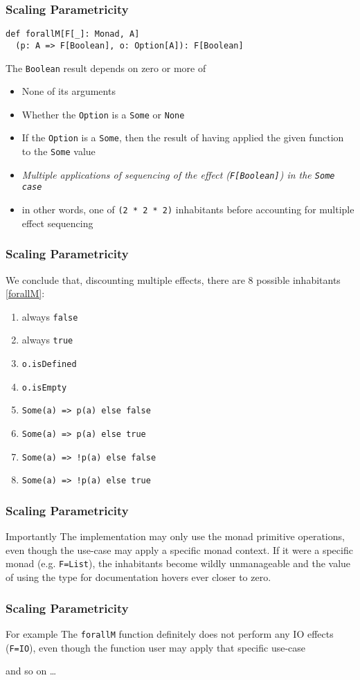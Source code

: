 \begin{frame}[fragile]
\frametitle{Scaling Parametricity}
\begin{lstlisting}[style=scala]
def forallM[F[_]: Monad, A]
  (p: A => F[Boolean], o: Option[A]): F[Boolean]
\end{lstlisting}
\begin{theorem}
  The \lstinline{Boolean} result depends on zero or more of
  \begin{itemize}
    \item None of its arguments
    \item Whether the \lstinline{Option} is a \lstinline{Some} or \lstinline{None}
    \item If the \lstinline{Option} is a \lstinline{Some}, then the result of having applied the given function to the \lstinline{Some} value
    \item \emph{Multiple applications of sequencing of the effect (\lstinline{F[Boolean]}) in the \lstinline{Some case}}
    \item in other words, one of \lstinline{(2 * 2 * 2)} inhabitants before accounting for multiple effect sequencing
  \end{itemize}
\end{theorem}
\end{frame}

\begin{frame}[fragile]
\frametitle{Scaling Parametricity}
  We conclude that, discounting multiple effects, there are 8 possible inhabitants \ref{forallM}:
  \begin{enumerate}
    \item always \lstinline{false}
    \item always \lstinline{true}
    \item \lstinline{o.isDefined}
    \item \lstinline{o.isEmpty}
    \item \lstinline{Some(a) => p(a) else false}
    \item \lstinline{Some(a) => p(a) else true}
    \item \lstinline{Some(a) => !p(a) else false}
    \item \lstinline{Some(a) => !p(a) else true}
  \end{enumerate}
\end{frame}

\begin{frame}[fragile]
\frametitle{Scaling Parametricity}
  \begin{block}{Importantly}
  The implementation may only use the monad primitive operations, even though the use-case may apply a specific monad context. If it were a specific monad (e.g. \lstinline{F=List}), the inhabitants become wildly unmanageable and the value of using the type for documentation hovers ever closer to zero.
  \end{block}
\end{frame}

\begin{frame}[fragile]
\frametitle{Scaling Parametricity}
  \begin{block}{For example}
  The \lstinline{forallM} function definitely does not perform any IO effects (\lstinline{F=IO}), even though the function user may apply that specific use-case
  \end{block}
  and so on \ldots
\end{frame}
